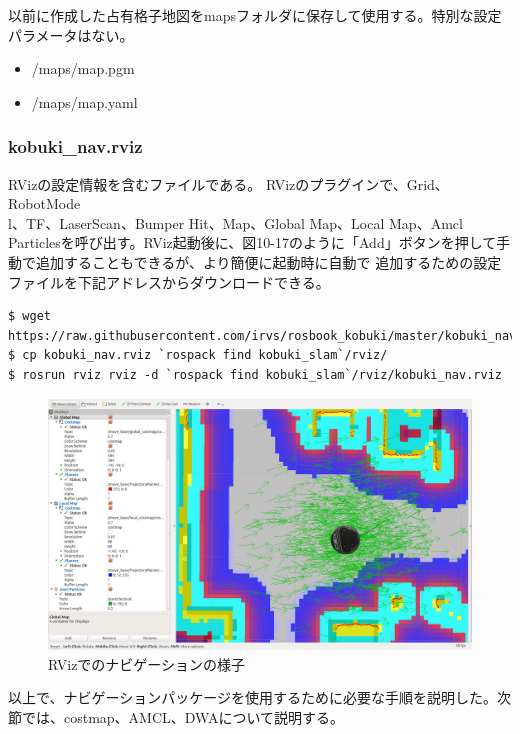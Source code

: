 以前に作成した占有格子地図をmapsフォルダに保存して使用する。特別な設定パラメータはない。

\begin{itemize}
\item /maps/map.pgm
\item /maps/map.yaml
\end{itemize}

\subsubsection{kobuki\_nav.rviz}

RVizの設定情報を含むファイルである。 RVizのプラグインで、Grid、RobotMode\\l、TF、LaserScan、Bumper Hit、Map、Global Map、Local Map、Amcl Particlesを呼び出す。RViz起動後に、図10-17のように「Add」ボタンを押して手動で追加することもできるが、より簡便に起動時に自動で  追加するための設定ファイルを下記アドレスからダウンロードできる。

\begin{lstlisting}[language=ROS]
$ wget https://raw.githubusercontent.com/irvs/rosbook_kobuki/master/kobuki_navigation/rviz/kobuki_nav.rviz
$ cp kobuki_nav.rviz `rospack find kobuki_slam`/rviz/
$ rosrun rviz rviz -d `rospack find kobuki_slam`/rviz/kobuki_nav.rviz
\end{lstlisting}

\begin{figure}[htp]
  \centering
  \includegraphics[width=12cm]{pictures/chapter10/pic_10_17.png}
  \caption{RVizでのナビゲーションの様子}
\end{figure}

以上で、ナビゲーションパッケージを使用するために必要な手順を説明した。次節では、costmap、AMCL、DWAについて説明する。

